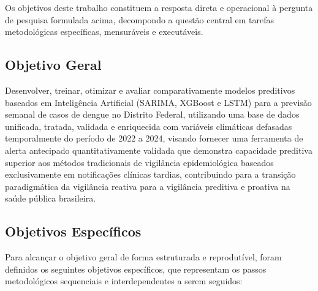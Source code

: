 Os objetivos deste trabalho constituem a resposta direta e operacional à pergunta de pesquisa formulada acima, decompondo a questão central em tarefas metodológicas específicas, mensuráveis e executáveis.

\subsection{Objetivo Geral}

Desenvolver, treinar, otimizar e avaliar comparativamente modelos preditivos baseados em Inteligência Artificial (SARIMA, XGBoost e LSTM) para a previsão semanal de casos de dengue no Distrito Federal, utilizando uma base de dados unificada, tratada, validada e enriquecida com variáveis climáticas defasadas temporalmente do período de 2022 a 2024, visando fornecer uma ferramenta de alerta antecipado quantitativamente validada que demonstra capacidade preditiva superior aos métodos tradicionais de vigilância epidemiológica baseados exclusivamente em notificações clínicas tardias, contribuindo para a transição paradigmática da vigilância reativa para a vigilância preditiva e proativa na saúde pública brasileira.

\subsection{Objetivos Específicos}

Para alcançar o objetivo geral de forma estruturada e reprodutível, foram definidos os seguintes objetivos específicos, que representam os passos metodológicos sequenciais e interdependentes a serem seguidos:

